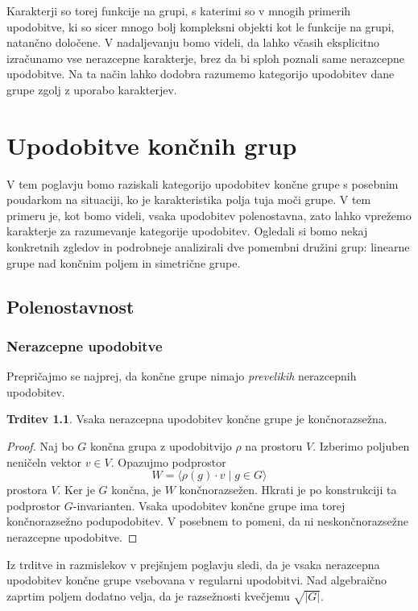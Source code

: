 \documentclass[11pt]{book}
\theoremstyle{definition}
\theoremstyle{zgled}
\theoremstyle{odprtproblem}
\theoremstyle{domacanaloga}
\newenvironment{dokaz}
    {\color{siva}\begin{proof}}
    {\end{proof}}
\theoremstyle{izrek}
\newtheorem*{trditev}{Trditev}
\begin{document}
Karakterji so torej funkcije na grupi, s katerimi so v mnogih primerih upodobitve, ki so sicer mnogo bolj kompleksni objekti kot le funkcije na grupi, natančno določene. V nadaljevanju bomo videli, da lahko včasih eksplicitno izračunamo vse nerazcepne karakterje, brez da bi sploh poznali same nerazcepne upodobitve. Na ta način lahko dodobra razumemo kategorijo upodobitev dane grupe zgolj z uporabo karakterjev.

\chapter{Upodobitve končnih grup}

V tem poglavju bomo raziskali kategorijo upodobitev končne grupe s posebnim poudarkom na situaciji, ko je karakteristika polja tuja moči grupe. V tem primeru je, kot bomo videli, vsaka upodobitev polenostavna, zato lahko vprežemo karakterje za razumevanje kategorije upodobitev. Ogledali si bomo nekaj konkretnih zgledov in podrobneje analizirali dve pomembni družini grup: linearne grupe nad končnim poljem in simetrične grupe.

\section{Polenostavnost}

\subsection{Nerazcepne upodobitve}

Prepričajmo se najprej, da končne grupe nimajo \emph{prevelikih} nerazcepnih upodobitev.

\begin{trditev}
Vsaka nerazcepna upodobitev končne grupe je končnorazsežna.
\end{trditev}
\begin{dokaz}
Naj bo $G$ končna grupa z upodobitvijo $\rho$ na prostoru $V$. Izberimo poljuben neničeln vektor $v \in V$. Opazujmo podprostor
\[
    W = \langle \rho(g) \cdot v \mid g \in G \rangle
\]
prostora $V$. Ker je $G$ končna, je $W$ končnorazsežen. Hkrati je po konstrukciji ta podprostor $G$-invarianten. Vsaka upodobitev končne grupe ima torej končnorazsežno podupodobitev. V posebnem to pomeni, da ni neskončnorazsežne nerazcepne upodobitve.
\end{dokaz}

Iz trditve in razmislekov v prejšnjem poglavju sledi, da je vsaka nerazcepna upodobitev končne grupe vsebovana v regularni upodobitvi. Nad algebraično zaprtim poljem dodatno velja, da je razsežnosti kvečjemu $\sqrt{|G|}$.
\end{document}

